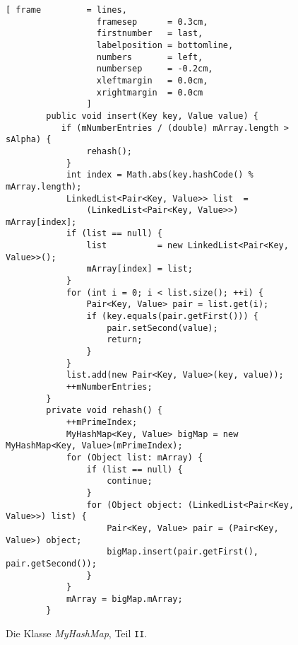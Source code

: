 \begin{figure}[!ht]
  \centering
\begin{Verbatim}[ frame         = lines, 
                  framesep      = 0.3cm, 
                  firstnumber   = last,
                  labelposition = bottomline,
                  numbers       = left,
                  numbersep     = -0.2cm,
                  xleftmargin   = 0.0cm,
                  xrightmargin  = 0.0cm
                ]
        public void insert(Key key, Value value) {
           if (mNumberEntries / (double) mArray.length > sAlpha) {
                rehash();
            }
            int index = Math.abs(key.hashCode() % mArray.length);
            LinkedList<Pair<Key, Value>> list  = 
                (LinkedList<Pair<Key, Value>>) mArray[index];
            if (list == null) {
                list          = new LinkedList<Pair<Key, Value>>();
                mArray[index] = list;
            }
            for (int i = 0; i < list.size(); ++i) {
                Pair<Key, Value> pair = list.get(i);
                if (key.equals(pair.getFirst())) {
                    pair.setSecond(value);
                    return;
                }
            }
            list.add(new Pair<Key, Value>(key, value));
            ++mNumberEntries;
        }
        private void rehash() {
            ++mPrimeIndex;
            MyHashMap<Key, Value> bigMap = new MyHashMap<Key, Value>(mPrimeIndex);
            for (Object list: mArray) {
                if (list == null) {
                    continue;
                }
                for (Object object: (LinkedList<Pair<Key, Value>>) list) {
                    Pair<Key, Value> pair = (Pair<Key, Value>) object;
                    bigMap.insert(pair.getFirst(), pair.getSecond());
                }
            }
            mArray = bigMap.mArray;
        }
\end{Verbatim}
\vspace*{-0.3cm}
  \caption{Die Klasse \textsl{MyHashMap}, Teil \texttt{II}.}
  \label{fig:MyHashMap-II}
\end{figure}


